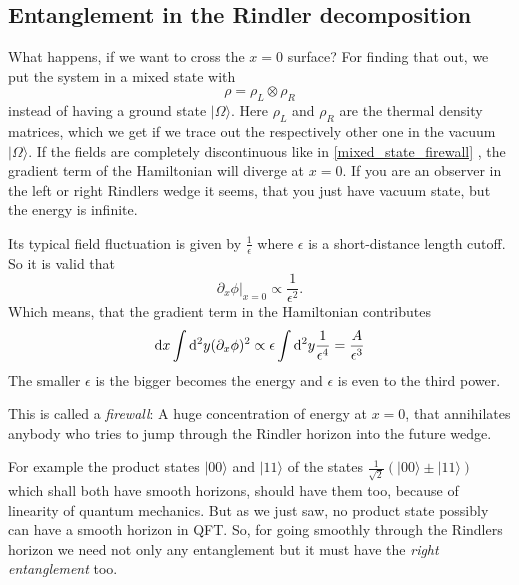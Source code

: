 	\subsection{Entanglement in the Rindler decomposition \checkmark}
	What happens, if we want to cross the $x=0$ surface? For finding that out, we put the system in a mixed state with
		\begin{equation} \label{mixed_state_firewall}
			\rho=\rho_L \otimes \rho_R
		\end{equation}
	instead of having a ground state $|\Omega\rangle$. Here $\rho_L$ and $\rho_R$ are the thermal density matrices, which we get if we trace out the respectively other one in the vacuum $|\Omega\rangle$.
	If the fields are completely discontinuous like in \eqref{mixed_state_firewall} , the gradient term of the Hamiltonian will diverge at $x=0$. If you are an observer in the left or right Rindlers wedge it seems, that you just have vacuum state, but the energy is infinite. 
	
	Its typical field fluctuation is given by $\frac{1}{\epsilon}$ where $\epsilon$ is a short-distance length cutoff.  So it is valid that
		\begin{equation}
			\partial_x \phi|_{x=0} \propto \frac{1}{\epsilon^2}.
		\end{equation}
	Which means, that the gradient term in the Hamiltonian contributes
		\begin{equation}
			\mathrm{d} x \int \mathrm{d}^2 y (\partial_x\phi)^2 \propto 
			\epsilon \int \mathrm{d}^2 y \frac{1}{\epsilon^4} 
			= \frac{A}{\epsilon^3}
		\end{equation}	
	The smaller $\epsilon$ is the bigger becomes the energy and $\epsilon$ is even to the third power.
	 			
	This is called a \textit{firewall}: A huge concentration of energy at $x=0$, that annihilates anybody who tries to jump through the Rindler horizon into the future wedge.
	
	For example the product states $|00\rangle$ and $|11\rangle$ of the states $\frac{1}{\sqrt{2}}
	(|00\rangle \pm |11\rangle)$ which shall both have smooth horizons, should have them too, because of linearity of quantum mechanics. But as we just saw, no product state possibly can have a smooth horizon in QFT. So, for going smoothly through the Rindlers horizon we need not only any entanglement but it must have the \textit{right entanglement} too.
